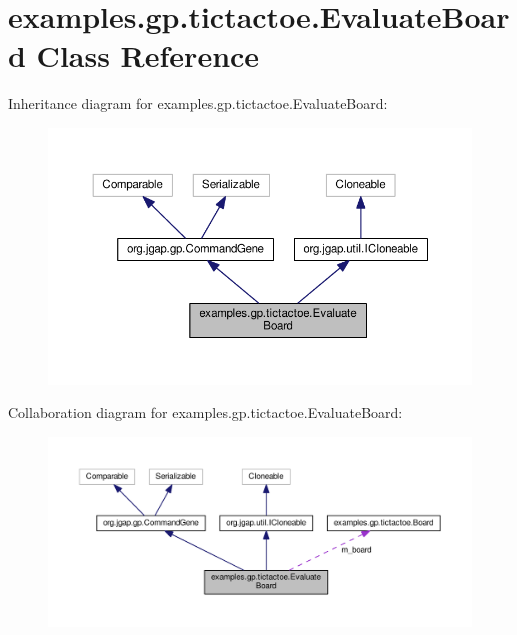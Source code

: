 \hypertarget{classexamples_1_1gp_1_1tictactoe_1_1_evaluate_board}{\section{examples.\-gp.\-tictactoe.\-Evaluate\-Board Class Reference}
\label{classexamples_1_1gp_1_1tictactoe_1_1_evaluate_board}
}


Inheritance diagram for examples.\-gp.\-tictactoe.\-Evaluate\-Board\-:
\nopagebreak
\begin{figure}[H]
\begin{center}
\leavevmode
\includegraphics[width=350pt]{classexamples_1_1gp_1_1tictactoe_1_1_evaluate_board__inherit__graph}
\end{center}
\end{figure}


Collaboration diagram for examples.\-gp.\-tictactoe.\-Evaluate\-Board\-:
\nopagebreak
\begin{figure}[H]
\begin{center}
\leavevmode
\includegraphics[width=350pt]{classexamples_1_1gp_1_1tictactoe_1_1_evaluate_board__coll__graph}
\end{center}
\end{figure}
